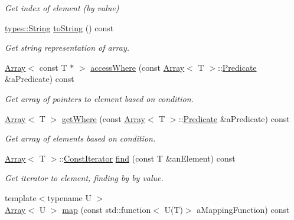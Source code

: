 \begin{DoxyCompactItemize}
\begin{DoxyCompactList}\small\item\em Get index of element (by value) \end{DoxyCompactList}\item 
\hyperlink{classostk_1_1core_1_1types_1_1_string}{types\+::\+String} \hyperlink{classostk_1_1core_1_1ctnr_1_1_array_ae37fc56c3d30592d785ea620cbcaf0ce}{to\+String} () const
\begin{DoxyCompactList}\small\item\em Get string representation of array. \end{DoxyCompactList}\item 
\hyperlink{classostk_1_1core_1_1ctnr_1_1_array}{Array}$<$ const T $\ast$ $>$ \hyperlink{classostk_1_1core_1_1ctnr_1_1_array_a13881bfc56b23de68e3d50cd07b7944e}{access\+Where} (const \hyperlink{classostk_1_1core_1_1ctnr_1_1_array}{Array}$<$ T $>$\+::\hyperlink{classostk_1_1core_1_1ctnr_1_1_array_a7c04a98dd10cd625acf96addd312d0af}{Predicate} \&a\+Predicate) const
\begin{DoxyCompactList}\small\item\em Get array of pointers to element based on condition. \end{DoxyCompactList}\item 
\hyperlink{classostk_1_1core_1_1ctnr_1_1_array}{Array}$<$ T $>$ \hyperlink{classostk_1_1core_1_1ctnr_1_1_array_adc03cfa862d43df7734e69f685534bf1}{get\+Where} (const \hyperlink{classostk_1_1core_1_1ctnr_1_1_array}{Array}$<$ T $>$\+::\hyperlink{classostk_1_1core_1_1ctnr_1_1_array_a7c04a98dd10cd625acf96addd312d0af}{Predicate} \&a\+Predicate) const
\begin{DoxyCompactList}\small\item\em Get array of elements based on condition. \end{DoxyCompactList}\item 
\hyperlink{classostk_1_1core_1_1ctnr_1_1_array}{Array}$<$ T $>$\+::\hyperlink{classostk_1_1core_1_1ctnr_1_1_array_acf6e5ab86e3ad3e125f61b1933772a14}{Const\+Iterator} \hyperlink{classostk_1_1core_1_1ctnr_1_1_array_abf965f4f2eaa744eeeafd315837ec9fb}{find} (const T \&an\+Element) const
\begin{DoxyCompactList}\small\item\em Get iterator to element, finding by by value. \end{DoxyCompactList}\item 
{\footnotesize template$<$typename U $>$ }\\\hyperlink{classostk_1_1core_1_1ctnr_1_1_array}{Array}$<$ U $>$ \hyperlink{classostk_1_1core_1_1ctnr_1_1_array_abf98d57cd72f4f544c16b1ad716858c1}{map} (const std\+::function$<$ U(T)$>$ a\+Mapping\+Function) const

\end{DoxyCompactItemize}

